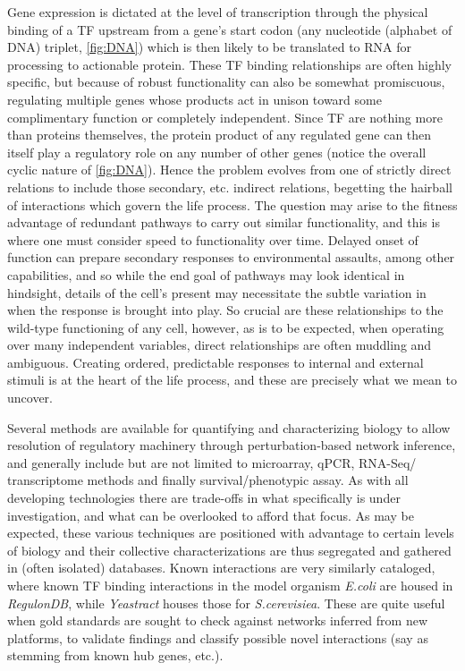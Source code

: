 Gene expression is dictated at the level of transcription through the physical binding of a TF upstream from a gene's start codon (any nucleotide (alphabet of DNA) triplet, \cref{fig:DNA}) which is then likely to be translated to RNA for processing to actionable protein. These TF binding relationships are often highly specific, but because of robust functionality can also be somewhat promiscuous, regulating multiple genes whose products act in unison toward some complimentary function or completely independent. Since TF are nothing more than proteins themselves, the protein product of any regulated gene can then itself play a regulatory role on any number of other genes (notice the overall cyclic nature of \cref{fig:DNA}). Hence the problem evolves from one of strictly direct relations to include those secondary, etc. indirect relations, begetting the hairball of interactions which govern the life process. The question may arise to the fitness advantage of redundant pathways to carry out similar functionality, and this is where one must consider speed to functionality over time. Delayed onset of function can prepare secondary responses to environmental assaults, among other capabilities, and so while the end goal of pathways may look identical in hindsight, details of the cell's present may necessitate the subtle variation in when the response is brought into play. So crucial are these relationships to the wild-type functioning of any cell, however, as is to be expected, when operating over many independent variables, direct relationships are often muddling and ambiguous. Creating ordered, predictable responses to internal and external stimuli is at the heart of the life process, and these are precisely what we mean to uncover.

Several methods are available for quantifying and characterizing biology to allow resolution of regulatory machinery through perturbation-based network inference, and generally include but are not limited to microarray, qPCR, RNA-Seq/ transcriptome methods and finally survival/phenotypic assay. As with all developing technologies there are trade-offs in what specifically is under investigation, and what can be overlooked to afford that focus. As may be expected, these various techniques are positioned with advantage to certain levels of biology and their collective characterizations are thus segregated and gathered in (often isolated) databases. Known interactions are very similarly cataloged, where known TF binding interactions in the model organism \emph{E.coli} are housed in \emph{RegulonDB}\cite{gama2008regulondb}, while \emph{Yeastract}\cite{teixeira2006yeastract} houses those for \emph{S.cerevisiea}. These are quite useful when gold standards are sought to check against networks inferred from new platforms, to validate findings and classify possible novel interactions (say as stemming from known hub genes, etc.).

